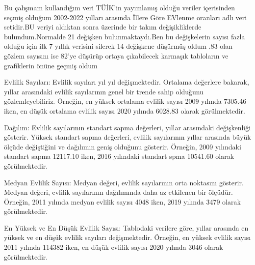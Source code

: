\documentclass[
  12pt,
]{article}
\begin{document}
Bu çalışmam kullandığım veri TÜİK'in yayımlamış olduğu veriler içerisinden seçmiş olduğum 2002-2022 yılları arasında İllere Göre EVlenme oranları adlı veri setidir.BU veriyi aldıktan sonra üzerinde bir takım değişikliklerde bulundum.Normalde 21 değişken bulunmaktaydı.Ben bu değişkelerin sayısı fazla olduğu için ilk 7 yıllık verisini silerek 14 değişkene düşürmüş oldum .83 olan gözlem sayısını ise 82'ye düşürüp ortaya çıkabilecek karmaşık tabloların ve grafiklerin önüne geçmiş oldum

Evlilik Sayıları: Evlilik sayıları yıl yıl değişmektedir. Ortalama değerlere bakarak, yıllar arasındaki evlilik sayılarının genel bir trende sahip olduğunu gözlemleyebiliriz. Örneğin, en yüksek ortalama evlilik sayısı 2009 yılında 7305.46 iken, en düşük ortalama evlilik sayısı 2020 yılında 6028.83 olarak görülmektedir.

Dağılım: Evlilik sayılarının standart sapma değerleri, yıllar arasındaki değişkenliği gösterir. Yüksek standart sapma değerleri, evlilik sayılarının yıllar arasında büyük ölçüde değiştiğini ve dağılımın geniş olduğunu gösterir. Örneğin, 2009 yılındaki standart sapma 12117.10 iken, 2016 yılındaki standart spma 10541.60 olarak görülmektedir.

Medyan Evlilik Sayısı: Medyan değeri, evlilik sayılarının orta noktasını gösterir. Medyan değeri, evlilik sayılarının dağılımında daha az etkilenen bir ölçüdür. Örneğin, 2011 yılında medyan evlilik sayısı 4048 iken, 2019 yılında 3479 olarak görülmektedir.

En Yüksek ve En Düşük Evlilik Sayısı: Tablodaki verilere göre, yıllar arasında en yüksek ve en düşük evlilik sayıları değişmektedir. Örneğin, en yüksek evlilik sayısı 2011 yılında 114382 iken, en düşük evlilik sayısı 2020 yılında 3046 olarak görülmektedir.
\end{document}

